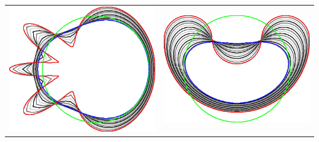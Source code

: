 \begin{frame}
{\begin{tabular}{cc}
\includegraphics[scale=0.12]{figures/graphcut/no-neighborhood-flow-always-improve/flower.png}\hspace{3em} &
\includegraphics[scale=0.12]{figures/graphcut/no-neighborhood-flow-always-improve/bean.png}
\end{tabular}}
\end{frame}

